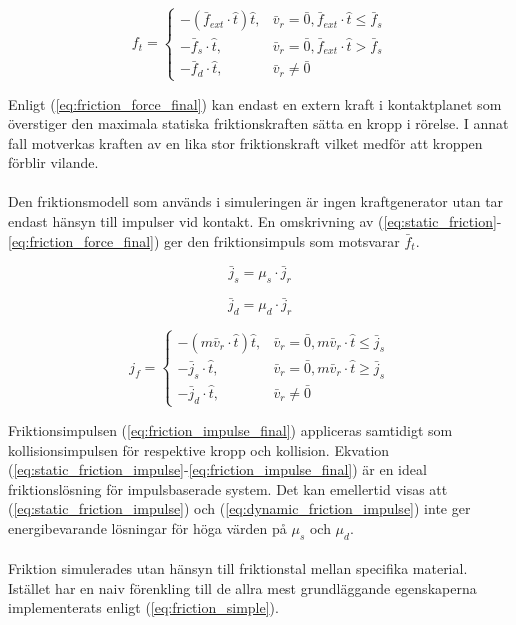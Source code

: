 \documentclass[a4paper,12pt,twopage,swedish]{article}
\begin{document}
\begin{equation}\label{eq:friction_force_final}
f_t =\begin{cases}
    -(\bar{f}_{ext} \cdot \hat{t})\hat{t}, & \bar{v}_r = \bar{0}, \bar{f}_{ext} \cdot \hat{t} \le \bar{f}_s \\
    -\bar{f}_s \cdot \hat{t}, & \bar{v}_r = \bar{0}, \bar{f}_{ext} \cdot \hat{t} > \bar{f}_s \\
    - \bar{f}_d \cdot \hat{t} , & \bar{v}_r \ne \bar{0}
  \end{cases}
\end{equation}

Enligt (\ref{eq:friction_force_final}) kan endast en extern kraft i kontaktplanet som överstiger den maximala statiska friktionskraften sätta en kropp i rörelse. I annat fall motverkas kraften av en lika stor friktionskraft vilket medför att kroppen förblir vilande.
\\
\\Den friktionsmodell som används i simuleringen är ingen kraftgenerator utan tar endast hänsyn till impulser vid kontakt. En omskrivning av (\ref{eq:static_friction}-\ref{eq:friction_force_final}) ger den friktionsimpuls som motsvarar $\bar{f}_t$.

\begin{equation}\label{eq:static_friction_impulse}
\bar{j}_s = \mu_s \cdot \bar{j}_r
\end{equation}

\begin{equation}\label{eq:dynamic_friction_impulse}
\bar{j}_d = \mu_d \cdot \bar{j}_r
\end{equation}

\begin{equation}\label{eq:friction_impulse_final}
j_f =\begin{cases}
    -(m\bar{v}_r \cdot \hat{t})\hat{t}, & \bar{v}_r = \bar{0}, m\bar{v}_r \cdot \hat{t} \le \bar{j}_s \\
    -\bar{j}_s \cdot \hat{t}, & \bar{v}_r = \bar{0}, m\bar{v}_r \cdot \hat{t} \ge \bar{j}_s \\
    - \bar{j}_d \cdot \hat{t} , & \bar{v}_r \ne \bar{0}
  \end{cases}
\end{equation}

Friktionsimpulsen (\ref{eq:friction_impulse_final}) appliceras samtidigt som kollisionsimpulsen för respektive kropp och kollision. Ekvation (\ref{eq:static_friction_impulse}-\ref{eq:friction_impulse_final}) är en ideal \cite{vella08} friktionslösning för impulsbaserade system. Det kan emellertid visas att (\ref{eq:static_friction_impulse}) och (\ref{eq:dynamic_friction_impulse}) inte ger energibevarande lösningar för höga värden på $\mu_s$ och $\mu_d$.
\\
\\Friktion simulerades utan hänsyn till friktionstal mellan specifika material. Istället har en naiv förenkling till de allra mest grundläggande egenskaperna implementerats enligt (\ref{eq:friction_simple}).
\end{document}
